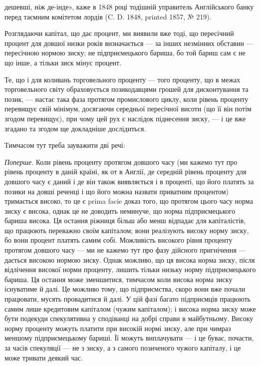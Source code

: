 \parcont{}  %
дешевші, ніж де-інде», каже в 1848 році тодішній управитель Англійського
банку перед таємним комітетом лордів (C. D. 1848, printed 1857, № 219).

Розглядаючи капітал, що дає процент, ми виявили вже тоді, що пересічний
процент для довшої низки років визначається — за інших незмінних обставин
— пересічною нормою зиску; не підприємецького бариша, бо той бариш
сам є не що інше, а тільки зиск мінус процент.

Те, що і для коливань торговельного проценту — того проценту, що в межах
торговельного світу обраховується позикодавцями грошей для дисконтування
та позик, — настає така фаза протягом промислового циклу, коли рівень проценту
перевищує свій мінімум, досягаючи середньої пересічної висоти (що її він
потім згодом перевищує), при чому цей рух є наслідок піднесення зиску, — і це
вже згадано та згодом ще докладніше дослідиться.

Тимчасом тут треба зауважити дві речі:

\emph{Поперше}. Коли рівень проценту протягом довшого часу (ми кажемо тут
про рівень проценту в даній країні, як от в Англії, де середній рівень проценту
для довшого часу є даний і де він також виявляється і в проценті, що його платять
за позики на довші реченці і що його можна назвати приватним процентом)
тримається високо, то це є prima facie доказ того, що протягом цього
часу норма зиску є висока, однак це не доводить неминуче, що норма підприємецького
бариша висока. Ця остання ріжниця більш або менш відпадає для
капіталістів, що працюють переважно своїм капіталом; вони реалізують високу
норму зиску, бо вони процент платять самим собі. Можливість високого рівня
проценту протягом довшого часу — ми не кажемо тут про фазу дійсного пригнічення
— дається високою нормою зиску. Однак можливо, що ця висока норма
зиску, після відлічення високої норми проценту, лишить тільки низьку норму
підприємецького бариша. Ця остання може зменшитися, тимчасом коли висока
норма зиску існуватиме й далі. Це можливо тому, що підприємства, скоро вони
вже почали працювати, мусять провадитися й далі. У цій фазі багато підприємців
працюють самим лише кредитовим капіталом (чужим капіталом); і висока
норма зиску може бути подекуди спекулятивна у сподіванці на добрі справи
в майбутньому. Високу норму проценту можуть платити при високій нормі зиску,
але при чимраз меншому підприємецькому бариші. Її можуть виплачувати —
і це буває, почасти, за часів спекуляції — не з зиску, а з самого позиченого
чужого капіталу, і це може тривати деякий час.

